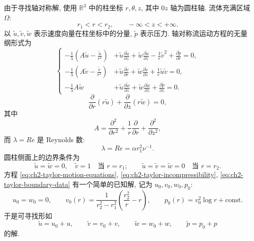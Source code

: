 由于寻找轴对称解, 使用 $\mathbb R^3$ 中的柱坐标 $r,\theta,z$, 其中 $0z$ 轴为圆柱轴. 流体充满区域 $\Omega$:
\begin{equation}
r_1<r<r_2,
\qquad-\infty<z<+\infty.
\label{eq:ch2-taylor-domain}
\end{equation}
以 $\widetilde u,\widetilde v,\widetilde w$ 表示速度向量在柱坐标中的分量, $\widetilde p$ 表示压力. 轴对称流运动方程的无量纲形式为
\begin{equation}
\left\{
\begin{aligned}
-\frac1\lambda\left(A\widetilde u-\frac{\widetilde u}{r^2}\right)
&+\widetilde u\frac{\partial\widetilde u}{\partial z}
+\widetilde w\frac{\partial\widetilde u}{\partial z}
-\frac1r\widetilde v^2+\frac{\partial\widetilde p}{\partial r}=0,\\
-\frac1\lambda\left(A\widetilde v-\frac{\widetilde v}{r^2}\right)
&+\widetilde u\frac{\partial\widetilde v}{\partial r}
+\widetilde w\frac{\partial\widetilde v}{\partial z}
+\frac1r\widetilde u\widetilde v=0,\\
-\frac1\lambda A\widetilde w
&+\widetilde u\frac{\partial\widetilde w}{\partial z}
+\widetilde w\frac{\partial\widetilde w}{\partial z}
+\frac{\partial\widetilde p}{\partial z}=0.
\end{aligned}
\right.
\label{eq:ch2-taylor-motion-equations}
\end{equation}
\begin{equation}
\frac\partial{\partial r}(r\widetilde u)
+\frac\partial{\partial z}(r\widetilde w)=0,
\label{eq:ch2-taylor-incompressibility}
\end{equation}
其中
\begin{equation}
A=\frac{\partial^2}{\partial r^2}
+\frac1r\frac\partial{\partial r}
+\frac{\partial^2}{\partial z^2},
\label{eq:ch2-taylor-operator-a}
\end{equation}
而 $\lambda=Re$ 是 Reynolds 数:
\begin{equation}
\lambda=Re=\alpha r_1^2\nu^{-1}.
\label{eq:ch2-taylor-reynolds-number}
\end{equation}
圆柱侧面上的边界条件为
\begin{equation}
\widetilde u=\widetilde w=0,\quad\widetilde v=1\quad\text{当 }r=r_1;
\qquad
\widetilde u=\widetilde v=\widetilde w=0\quad\text{当 }r=r_2.
\label{eq:ch2-taylor-boundary-data}
\end{equation}
方程 \eqref{eq:ch2-taylor-motion-equations}, \eqref{eq:ch2-taylor-incompressibility}, \eqref{eq:ch2-taylor-boundary-data} 有一个简单的已知解, 记为 $u_0,v_0,w_0,p_0$:
\begin{equation}
u_0=w_0=0,
\qquad
v_0(r)=\frac1{r_2^2-r_1^2}\left(\frac{r_2^2}{r}-r\right),
\qquad
p_0(r)=v_0^2\log r+\mathrm{const}.
\label{eq:ch2-taylor-trivial-base-solution}
\end{equation}
于是可寻找形如
\[
\widetilde u=u_0+u,
\qquad\widetilde v=v_0+v,
\qquad\widetilde w=w_0+w,
\qquad\widetilde p=p_0+p
\]
的解.

